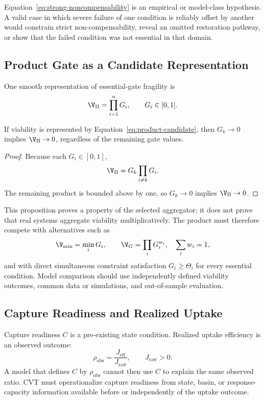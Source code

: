 Equation~\eqref{eq:strong-noncompensability} is an empirical or model-class hypothesis. A valid case in which severe failure of one condition is reliably offset by another would constrain strict non-compensability, reveal an omitted restoration pathway, or show that the failed condition was not essential in that domain.

\subsection{Product Gate as a Candidate Representation}

One smooth representation of essential-gate fragility is
\begin{equation}
    \V_{\Pi}
    =
    \prod_{i=1}^{n}G_i,
    \qquad G_i\in[0,1].
    \label{eq:product-candidate}
\end{equation}

\begin{proposition}
If viability is represented by Equation~\eqref{eq:product-candidate}, then \(G_k\to 0\) implies \(\V_{\Pi}\to 0\), regardless of the remaining gate values.
\end{proposition}

\begin{proof}
Because each \(G_i\in[0,1]\),
\[
    \V_{\Pi}
    =
    G_k\prod_{i\neq k}G_i.
\]
The remaining product is bounded above by one, so \(G_k\to0\) implies \(\V_{\Pi}\to0\).
\end{proof}

This proposition proves a property of the selected aggregator; it does not prove that real systems aggregate viability multiplicatively. The product must therefore compete with alternatives such as
\begin{equation}
    \V_{\min}=\min_i G_i,
    \qquad
    \V_G=\prod_i G_i^{w_i},\quad \sum_i w_i=1,
\end{equation}
and with direct simultaneous constraint satisfaction \(G_i\geq\Theta_i\) for every essential condition. Model comparison should use independently defined viability outcomes, common data or simulations, and out-of-sample evaluation.

\subsection{Capture Readiness and Realized Uptake}

Capture readiness \(C\) is a pre-existing state condition. Realized uptake efficiency is an observed outcome:
\begin{equation}
    \rho_{\mathrm{obs}}
    =
    \frac{J_{\mathrm{eff}}}{J_{\mathrm{raw}}},
    \qquad J_{\mathrm{raw}}>0.
\end{equation}
A model that defines \(C\) by \(\rho_{\mathrm{obs}}\) cannot then use \(C\) to explain the same observed ratio. CVT must operationalize capture readiness from state, basin, or response-capacity information available before or independently of the uptake outcome.

